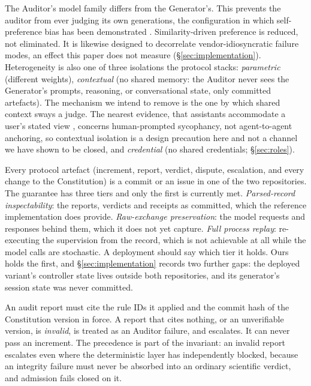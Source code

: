 \documentclass[11pt]{article}
\newcommand{\invariant}[1]{\textbf{I#1}}
\begin{document}
\begin{description}[itemsep=2pt,topsep=3pt]
  \item[\invariant{1} --- Heterogeneity.] The Auditor's model family differs from the Generator's. This prevents the auditor from ever judging its own generations, the configuration in which self-preference bias has been demonstrated \cite{panickssery2024}. Similarity-driven preference is reduced, not eliminated. It is likewise designed to decorrelate vendor-idiosyncratic failure modes, an effect this paper does not measure (\S\ref{sec:implementation}). Heterogeneity is also one of three isolations the protocol stacks: \emph{parametric} (different weights), \emph{contextual} (no shared memory: the Auditor never sees the Generator's prompts, reasoning, or conversational state, only committed artefacts). The mechanism we intend to remove is the one by which shared context sways a judge. The nearest evidence, that assistants accommodate a user's stated view \cite{sharma2023sycophancy}, concerns human-prompted sycophancy, not agent-to-agent anchoring, so contextual isolation is a design precaution here and not a channel we have shown to be closed, and \emph{credential} (no shared credentials; \S\ref{sec:roles}).
  \item[\invariant{2} --- Ledger completeness.] Every protocol artefact (increment, report, verdict, dispute, escalation, and every change to the Constitution) is a commit or an issue in one of the two repositories. The guarantee has three tiers and only the first is currently met. \emph{Parsed-record inspectability}: the reports, verdicts and receipts as committed, which the reference implementation does provide. \emph{Raw-exchange preservation}: the model requests and responses behind them, which it does not yet capture. \emph{Full process replay}: re-executing the supervision from the record, which is not achievable at all while the model calls are stochastic. A deployment should say which tier it holds. Ours holds the first, and \S\ref{sec:implementation} records two further gaps: the deployed variant's controller state lives outside both repositories, and its generator's session state was never committed.
  \item[\invariant{3} --- Citation validity.] An audit report must cite the rule IDs it applied and the commit hash of the Constitution version in force. A report that cites nothing, or an unverifiable version, is \emph{invalid}, is treated as an Auditor failure, and escalates. It can never pass an increment. The precedence is part of the invariant: an invalid report escalates even where the deterministic layer has independently blocked, because an integrity failure must never be absorbed into an ordinary scientific verdict, and admission fails closed on it.

\end{description}
\end{document}
